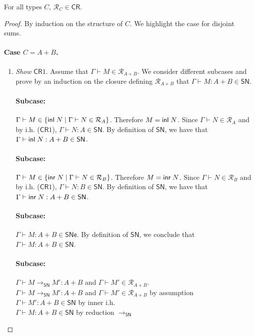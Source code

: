 \documentclass{article}
\newcommand{\SN}{\mathsf{SN}}
\newcommand{\SNe}{\mathsf{SNe}}
\newcommand{\CR}{\textsf{CR}}
\newcommand{\denot}[1]{\mathcal{R}_{#1}}
\newcommand{\inden}[3]{#1 \vdash #2 \in \denot{#3}}
\newcommand{\redSN}{\longrightarrow_\SN}
\begin{document}
\begin{theorem}
For all types $C$, $\denot{C}  \in \CR$.
\end{theorem}
\begin{proof}
By induction on the structure of $C$. We highlight the case for disjoint sums.

\paragraph{Case $C = A + B$.}

  \begin{enumerate}
  \item \textit{Show} $\CR1$. Assume that $\inden{\Gamma}{M}{A + B}$. We consider different subcases and prove by an induction on the closure defining $\denot{A + B}$ that $\Gamma \vdash M : A + B \in \SN$.

\paragraph{Subcase:} $\Gamma \vdash M \in \{\inl N \mid \inden{\Gamma}{N}{A}\}$. Therefore $M = \textsf{inl}\; N$. Since $\inden{\Gamma}{N}{A}$ and by i.h. ($\CR1$), $\Gamma \vdash N : A \in \SN$. By definition of $\SN$, we have that $\Gamma \vdash \inl N : A + B \in \SN$.

\paragraph{Subcase:} $\Gamma \vdash M \in \{\inr N \mid \inden{\Gamma}{N}{B}\}$. Therefore $M = \textsf{inr}\; N$. Since $\inden{\Gamma}{N}{B}$ and by i.h. ($\CR1$), $\Gamma \vdash N : B \in \SN$. By definition of $\SN$, we have that $\Gamma \vdash \inr N : A + B \in \SN$.

\paragraph{Subcase:} $\Gamma \vdash M : A + B \in \SNe$. By definition of $\SN$, we conclude that $\Gamma \vdash M : A + B \in \SN$.

\paragraph{Subcase:} $\Gamma \vdash M \redSN M' : A + B$ and $\inden{\Gamma}{M'}{A+B}$.
\\[0.5em]
$\Gamma \vdash M \redSN M' : A + B$ and $\inden{\Gamma}{M'}{A + B}$ \hfill by assumption\\
$\Gamma \vdash M' : A + B \in \SN$ \hfill by inner i.h. \\
$\Gamma \vdash M : A + B \in \SN$ \hfill by reduction $\redSN$


\end{enumerate}
\end{proof}
\end{document}
